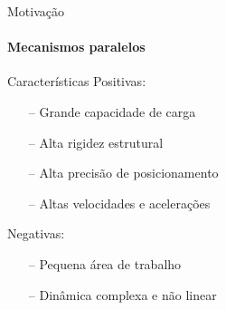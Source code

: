 \documentclass[25pt,landscape]{beamer}
\begin{document}
\begin{frame}
    \titlepage
\end{frame}








\begin{frame}{Motiva\c{c}\~ao}
    \framesubtitle{Mecanismos paralelos}
    \pause
    \begin{block}{Caracter\'isticas}
    	\pause
        Positivas: \\[8pt]
        \begin{itemize} 
            \item[--] Grande capacidade de carga \\[8pt]
            \item[--] Alta rigidez estrutural \\[8pt]
            \item[--] Alta precis\~ao de posicionamento \\[8pt]
            \item[--] Altas velocidades e acelera\c{c}\~oes \\[8pt]
        \end{itemize}
        \pause
        Negativas: \\[8pt]
        \begin{itemize}
            \item[--] Pequena \'area de trabalho \\[8pt]
            \item[--] Din\^amica complexa e n\~ao linear \\[8pt]
        \end{itemize}
    \end{block}
\end{frame}
\end{document}
